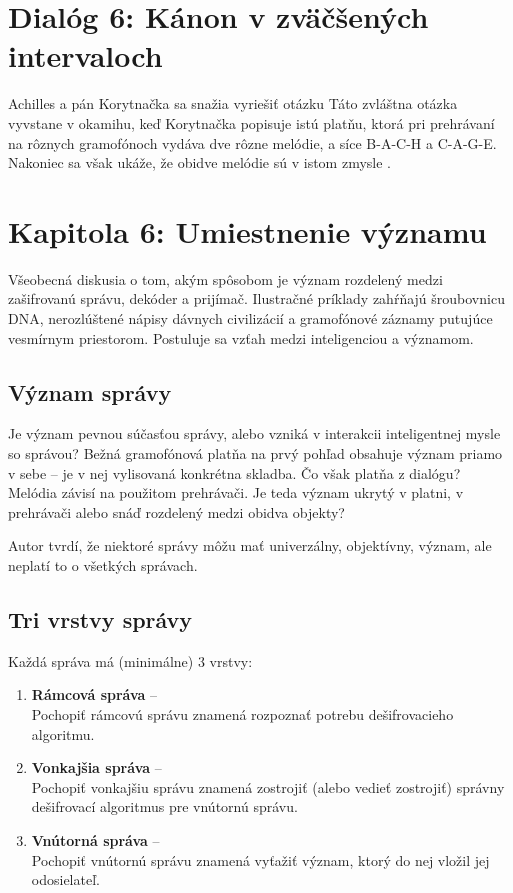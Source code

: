 \documentclass[12pt]{article}
\begin{document}
\section*{Dialóg 6: Kánon v zväčšených intervaloch}

Achilles a pán Korytnačka sa snažia vyriešiť otázku  Táto zvláštna otázka vyvstane v okamihu, keď Korytnačka popisuje istú platňu, ktorá pri prehrávaní na rôznych gramofónoch vydáva dve rôzne melódie, a síce B-A-C-H a C-A-G-E. Nakoniec sa však ukáže, že obidve melódie sú v istom zmysle .

\setcounter{section}{5}
\section*{Kapitola 6: Umiestnenie významu}

Všeobecná diskusia o tom, akým spôsobom je význam rozdelený medzi zašifrovanú správu, dekóder a prijímač. Ilustračné príklady zahŕňajú šroubovnicu DNA, nerozlúštené nápisy dávnych civilizácií a gramofónové záznamy putujúce vesmírnym priestorom. Postuluje sa vzťah medzi inteligenciou a  významom.

\subsection{Význam správy}

Je význam pevnou súčasťou správy, alebo vzniká v interakcii inteligentnej mysle so správou? Bežná gramofónová platňa na prvý pohľad obsahuje význam priamo v sebe -- je v nej vylisovaná konkrétna skladba. Čo však platňa z dialógu? Melódia závisí na použitom prehrávači. Je teda význam ukrytý v platni, v prehrávači alebo snáď rozdelený medzi obidva objekty?

Autor tvrdí, že niektoré správy môžu mať univerzálny, objektívny, význam, ale neplatí to o všetkých správach.

\subsection{Tri vrstvy správy}

Každá správa má (minimálne) 3 vrstvy:
\begin{enumerate}
\item \textbf{Rámcová správa} -- \\ Pochopiť rámcovú správu znamená rozpoznať potrebu dešifrovacieho algoritmu.
\item \textbf{Vonkajšia správa} -- \\Pochopiť vonkajšiu správu znamená zostrojiť (alebo vedieť zostrojiť) správny dešifrovací algoritmus pre vnútornú správu.
\item \textbf{Vnútorná správa} -- \\Pochopiť vnútornú správu znamená vyťažiť význam, ktorý do nej vložil jej odosielateľ.
\end{enumerate}
\end{document}
